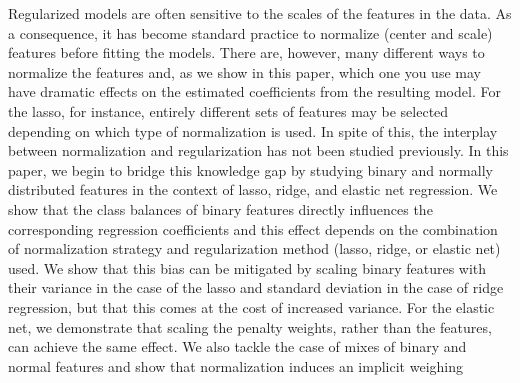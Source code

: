 Regularized models are often sensitive to the scales of the features in the data. As a
consequence, it has become standard practice to normalize (center and scale) features
before fitting the models. There are, however, many different ways to normalize the
features and, as we show in this paper, which one you use may have dramatic effects on the
estimated coefficients from the resulting model. For the lasso, for instance, entirely
different sets of features may be selected depending on which type of normalization is
used. In spite of this, the interplay between normalization and regularization has not been
studied previously. In this paper, we begin to bridge this knowledge gap by studying binary
and normally distributed features in the context of lasso, ridge, and elastic net
regression. We show that the class balances of binary features directly influences the
corresponding regression coefficients and this effect depends on the combination of
normalization strategy and regularization method (lasso, ridge, or elastic net) used. We
show that this bias can be mitigated by scaling binary features with their variance in the
case of the lasso and standard deviation in the case of ridge regression, but that this
comes at the cost of increased variance. For the elastic net, we demonstrate that scaling
the penalty weights, rather than the features, can achieve the same effect. We also tackle
the case of mixes of binary and normal features and show that normalization induces an
implicit weighing
